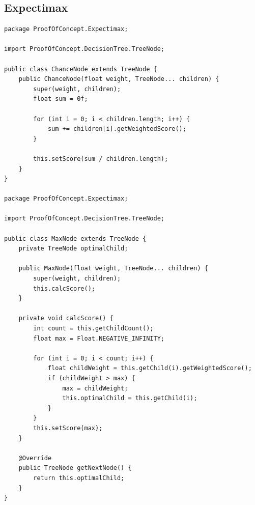 \documentclass{article}
\begin{document}
\subsection{Expectimax}
\label{subsec:apendixexpecti}
\begin{verbatim}
package ProofOfConcept.Expectimax;

import ProofOfConcept.DecisionTree.TreeNode;

public class ChanceNode extends TreeNode {
    public ChanceNode(float weight, TreeNode... children) {
        super(weight, children);
        float sum = 0f;

        for (int i = 0; i < children.length; i++) {
            sum += children[i].getWeightedScore();
        }

        this.setScore(sum / children.length);
    }
}

package ProofOfConcept.Expectimax;

import ProofOfConcept.DecisionTree.TreeNode;

public class MaxNode extends TreeNode {
    private TreeNode optimalChild;

    public MaxNode(float weight, TreeNode... children) {
        super(weight, children);
        this.calcScore();
    }

    private void calcScore() {
        int count = this.getChildCount();
        float max = Float.NEGATIVE_INFINITY;

        for (int i = 0; i < count; i++) {
            float childWeight = this.getChild(i).getWeightedScore();
            if (childWeight > max) {
                max = childWeight;
                this.optimalChild = this.getChild(i);
            }
        }
        this.setScore(max);
    }

    @Override
    public TreeNode getNextNode() {
        return this.optimalChild;
    }
}

\end{verbatim}
\end{document}
